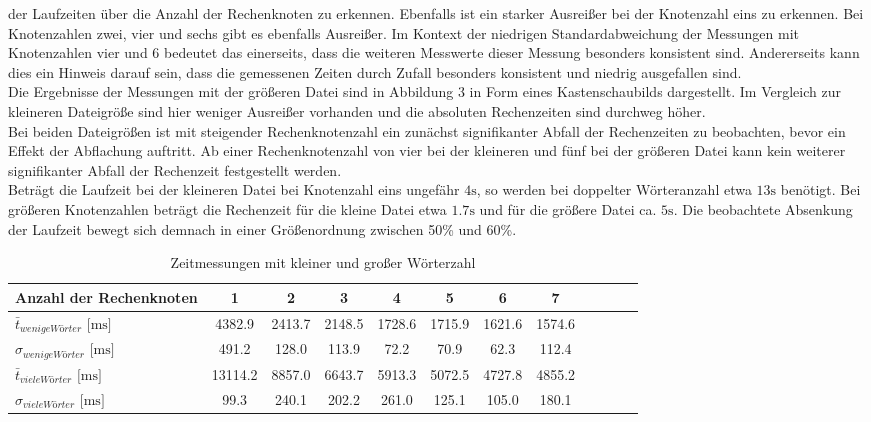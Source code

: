 der Laufzeiten über die Anzahl der Rechenknoten zu erkennen. Ebenfalls ist ein starker Ausreißer bei der Knotenzahl eins zu erkennen. Bei Knotenzahlen zwei, vier und sechs gibt es ebenfalls Ausreißer. Im Kontext der niedrigen Standardabweichung der Messungen mit Knotenzahlen vier und 6 bedeutet das einerseits, dass die weiteren Messwerte dieser Messung besonders konsistent sind. Andererseits kann dies ein Hinweis darauf sein, dass die gemessenen Zeiten durch Zufall besonders konsistent und niedrig ausgefallen sind.
\\
Die Ergebnisse der Messungen mit der größeren Datei sind in Abbildung 3 in Form eines Kastenschaubilds dargestellt. Im Vergleich zur kleineren Dateigröße sind hier weniger Ausreißer vorhanden und die absoluten Rechenzeiten sind durchweg höher.
\\
Bei beiden Dateigrößen ist mit steigender Rechenknotenzahl ein zunächst signifikanter Abfall der Rechenzeiten zu beobachten, bevor ein Effekt der Abflachung auftritt. Ab einer Rechenknotenzahl von vier bei der kleineren und fünf bei der größeren Datei kann kein weiterer signifikanter Abfall der Rechenzeit festgestellt werden.
\\
Beträgt die Laufzeit bei der kleineren Datei bei Knotenzahl eins ungefähr $4\text{s}$, so werden bei doppelter Wörteranzahl etwa $13\text{s}$ benötigt. Bei größeren Knotenzahlen beträgt die Rechenzeit für die kleine Datei etwa $1.7\text{s}$ und für die größere Datei ca. $5\text{s}$. Die beobachtete Absenkung der Laufzeit bewegt sich demnach in einer Größenordnung zwischen 50\% und 60\%.


\begin{table}
	\caption{Zeitmessungen mit kleiner und großer Wörterzahl}
	\label{zeiten_tabelle_lang_und_kurz}
	\begin{tabularx}{\textwidth}{@{}l*{10}{C}c@{}}
		\toprule
		Anzahl der Rechenknoten & 1 & 2 & 3 & 4 & 5 & 6 & 7 \\ 
		\midrule
		$\bar{t}_{wenige Wörter}$ $\text{[ms]}$ & 4382.9 & 2413.7 & 2148.5 & 1728.6 & 1715.9 & 1621.6 & 1574.6 \\
		$\sigma_{wenige Wörter}$ $\text{[ms]}$ & 491.2 & 128.0 & 113.9 & 72.2 & 70.9 & 62.3 & 112.4 \\
		\addlinespace
		$\bar{t}_{viele Wörter}$ $\text{[ms]}$ & 13114.2 & 8857.0 & 6643.7 & 5913.3 & 5072.5 & 4727.8 & 4855.2 \\
		$\sigma_{viele Wörter}$ $\text{[ms]}$ & 99.3 & 240.1 & 202.2 & 261.0 & 125.1 & 105.0 & 180.1 \\
		\bottomrule
	\end{tabularx}
\end{table}


